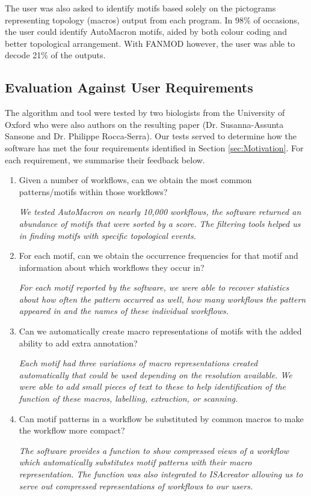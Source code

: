 The user was also asked to identify motifs based solely on the pictograms representing topology (macros) output from each program.
In 98\% of occasions, the user could identify AutoMacron motifs, aided by both colour coding and better topological arrangement.
With FANMOD however, the user was able to decode 21\% of the outputs. 

\subsection{Evaluation Against User Requirements}
%
The algorithm and tool were tested by two biologists from the University of Oxford who were also authors on the resulting paper (Dr. Susanna-Assunta Sansone and Dr. Philippe Rocca-Serra).
Our tests served to determine how the software has met the four requirements identified in Section \ref{sec:Motivation}.
For each requirement, we summarise their feedback below.

\vspace{-2mm}
\begin{enumerate}[itemsep=-1mm]
\item Given a number of workflows, can we obtain the most common patterns/motifs within those workflows?
  
    \emph{We tested AutoMacron on nearly 10,000 workflows, the software returned an abundance of motifs that were sorted by a score. The filtering tools helped us in finding motifs with specific topological events.}
  
\item For each motif, can we obtain the occurrence frequencies for that motif and information about which workflows they occur in?
  
    \emph{For each motif reported by the software, we were able to recover statistics about how often the pattern occurred as well, how many workflows the pattern appeared in and the names of these individual workflows.}
  
\item Can we automatically create macro representations of motifs with the added ability to add extra annotation?
  
    \emph{Each motif had three variations of macro representations created automatically that could be used depending on the resolution available. We were able to add small pieces of text to these to help identification of the function of these macros, \eg labelling, extraction, or scanning.}

\item Can motif patterns in a workflow be substituted by common macros to make the workflow more compact?
  
    \emph{The software provides a function to show compressed views of a workflow which automatically substitutes motif patterns with their macro representation. The function was also integrated to ISAcreator allowing us to serve out compressed representations of workflows to our users.}
\end{enumerate}

